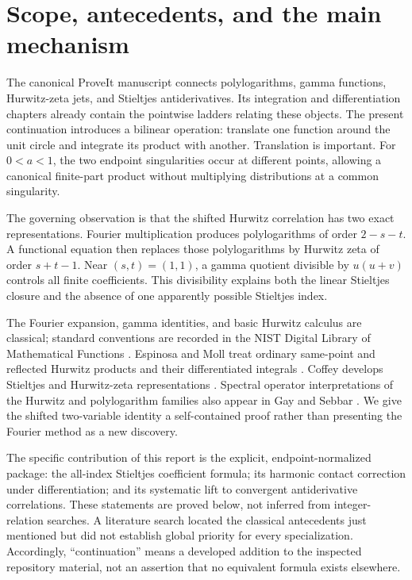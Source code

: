 \section{Scope, antecedents, and the main mechanism}\label{shj:scope}
The canonical ProveIt manuscript connects polylogarithms, gamma functions, Hurwitz-zeta jets, and Stieltjes antiderivatives. Its integration and differentiation chapters already contain the pointwise ladders relating these objects. The present continuation introduces a bilinear operation: translate one function around the unit circle and integrate its product with another. Translation is important. For $0<a<1$, the two endpoint singularities occur at different points, allowing a canonical finite-part product without multiplying distributions at a common singularity.

The governing observation is that the shifted Hurwitz correlation has two exact representations. Fourier multiplication produces polylogarithms of order $2-s-t$. A functional equation then replaces those polylogarithms by Hurwitz zeta of order $s+t-1$. Near $(s,t)=(1,1)$, a gamma quotient divisible by $u(u+v)$ controls all finite coefficients. This divisibility explains both the linear Stieltjes closure and the absence of one apparently possible Stieltjes index.

The Fourier expansion, gamma identities, and basic Hurwitz calculus are classical; standard conventions are recorded in the NIST Digital Library of Mathematical Functions \cite{shj:DLMF25,shj:DLMFpoly}. Espinosa and Moll treat ordinary same-point and reflected Hurwitz products and their differentiated integrals \cite{shj:EM}. Coffey develops Stieltjes and Hurwitz-zeta representations \cite{shj:Coffey}. Spectral operator interpretations of the Hurwitz and polylogarithm families also appear in Gay and Sebbar \cite{shj:GS}. We give the shifted two-variable identity a self-contained proof rather than presenting the Fourier method as a new discovery.

The specific contribution of this report is the explicit, endpoint-normalized package: the all-index Stieltjes coefficient formula; its harmonic contact correction under differentiation; and its systematic lift to convergent antiderivative correlations. These statements are proved below, not inferred from integer-relation searches. A literature search located the classical antecedents just mentioned but did not establish global priority for every specialization. Accordingly, ``continuation'' means a developed addition to the inspected repository material, not an assertion that no equivalent formula exists elsewhere.

